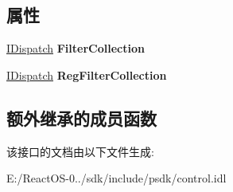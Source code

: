 \subsection*{属性}
\begin{DoxyCompactItemize}
\item 
\mbox{\label{interface_quartz_type_lib_1_1_i_media_control_a0e66a53ab1d08addf6189952c8268519}} 
\hyperlink{interface_i_dispatch}{I\+Dispatch} {\bfseries Filter\+Collection}
\item 
\mbox{\label{interface_quartz_type_lib_1_1_i_media_control_ae76c55f830cce7cc44c270cec2895990}} 
\hyperlink{interface_i_dispatch}{I\+Dispatch} {\bfseries Reg\+Filter\+Collection}
\end{DoxyCompactItemize}
\subsection*{额外继承的成员函数}


该接口的文档由以下文件生成\+:\begin{DoxyCompactItemize}
\item 
E\+:/\+React\+O\+S-\/0../sdk/include/psdk/control.\+idl\end{DoxyCompactItemize}
